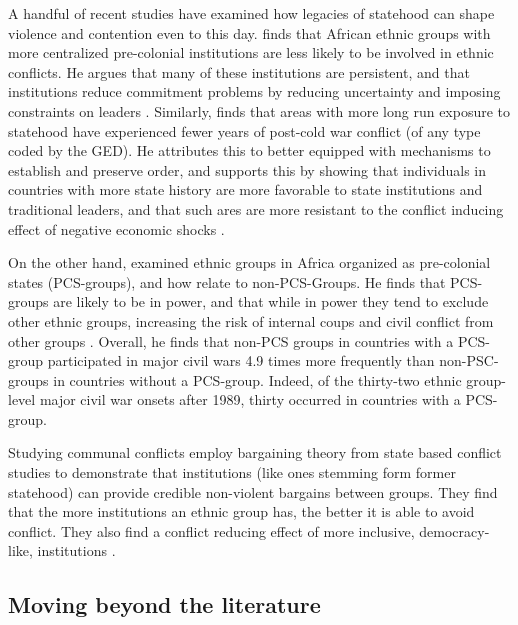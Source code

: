 A handful of recent studies have examined how legacies of statehood can shape
violence and contention even to this day. \citet{Wig2016} finds that African
ethnic groups with more centralized pre-colonial institutions are less likely to
be involved in ethnic conflicts. He argues that many of these institutions are
persistent, and that institutions reduce commitment problems by reducing
uncertainty and imposing constraints on leaders \citep{Wig2016}. Similarly,
\citet{Depetris-Chauvin2016} finds that areas with more long run exposure to
statehood have experienced fewer years of post-cold war conflict (of any type
coded by the GED). He attributes this to better equipped with mechanisms to
establish and preserve order, and supports this by showing that individuals in
countries with more state history are more favorable to state institutions and
traditional leaders, and that such ares are more resistant to the conflict
inducing effect of negative economic shocks \citep{Depetris-Chauvin2016}.

On the other hand, \citet{Paine2019} examined ethnic groups in Africa organized
as pre-colonial states (PCS-groups), and how relate to non-PCS-Groups. He finds
that PCS-groups are likely to be in power, and that while in power they tend to
exclude other ethnic groups, increasing the risk of internal coups and civil
conflict from other groups \citep{Paine2019}. Overall, he finds that non-PCS
groups in countries with a PCS-group participated in major civil wars 4.9 times
more frequently than non-PSC-groups in countries without a PCS-group. Indeed, of
the thirty-two ethnic group-level major civil war onsets after 1989, thirty
occurred in countries with a PCS-group.

Studying communal conflicts \citet{Wig2018} employ bargaining theory from state
based conflict studies to demonstrate that institutions (like ones stemming form
former statehood) can provide credible non-violent bargains between groups. They
find that the more institutions an ethnic group has, the better it is able to
avoid conflict. They also find a conflict reducing effect of more inclusive,
democracy-like, institutions \citep{Wig2018}.

\subsection{Moving beyond the literature} \label{Moving beyond}


